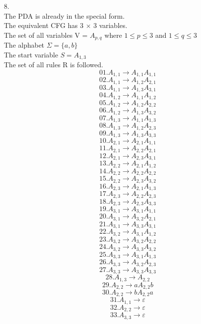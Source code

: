 \documentclass[a4paper]{article}
\begin{document}
8.\\
The PDA is already in the special form.\\
The equivalent CFG has 3 $\times$ 3 variables. \\
The set of all variables V = $A_{p,q}$ where $1 \leqslant p \leqslant 3$ and $1 \leqslant q \leqslant 3$\\
The alphabet $\Sigma = \{a,b\}$\\
The start variable $S = A_{1,3}$\\
The set of all rules R is followed.\\
$$01.A_{1,1} \rightarrow A_{1,1}A_{1,1}$$
$$02.A_{1,1} \rightarrow A_{1,2}A_{2,1}$$
$$03.A_{1,1} \rightarrow A_{1,3}A_{3,1}$$
$$04.A_{1,2} \rightarrow A_{1,1}A_{1,2}$$
$$05.A_{1,2} \rightarrow A_{1,2}A_{2,2}$$
$$06.A_{1,2} \rightarrow A_{1,3}A_{3,2}$$
$$07.A_{1,3} \rightarrow A_{1,1}A_{1,3}$$
$$08.A_{1,3} \rightarrow A_{1,2}A_{2,3}$$
$$09.A_{1,3} \rightarrow A_{1,3}A_{3,3}$$
$$10.A_{2,1} \rightarrow A_{2,1}A_{1,1}$$
$$11.A_{2,1} \rightarrow A_{2,2}A_{2,1}$$
$$12.A_{2,1} \rightarrow A_{2,3}A_{3,1}$$
$$13.A_{2,2} \rightarrow A_{2,1}A_{1,2}$$
$$14.A_{2,2} \rightarrow A_{2,2}A_{2,2}$$
$$15.A_{2,2} \rightarrow A_{2,3}A_{3,2}$$
$$16.A_{2,3} \rightarrow A_{2,1}A_{1,3}$$
$$17.A_{2,3} \rightarrow A_{2,2}A_{2,3}$$
$$18.A_{2,3} \rightarrow A_{2,3}A_{3,3}$$
$$19.A_{3,1} \rightarrow A_{3,1}A_{1,1}$$
$$20.A_{3,1} \rightarrow A_{3,2}A_{2,1}$$
$$21.A_{3,1} \rightarrow A_{3,3}A_{3,1}$$
$$22.A_{3,2} \rightarrow A_{3,1}A_{1,2}$$
$$23.A_{3,2} \rightarrow A_{3,2}A_{2,2}$$
$$24.A_{3,2} \rightarrow A_{3,3}A_{3,2}$$
$$25.A_{3,3} \rightarrow A_{3,1}A_{1,3}$$
$$26.A_{3,3} \rightarrow A_{3,2}A_{2,3}$$
$$27.A_{3,3} \rightarrow A_{3,3}A_{3,3}$$
$$28.A_{1,3} \rightarrow A_{2,2}$$
$$29.A_{2,2} \rightarrow aA_{2,2}b$$
$$30.A_{2,2} \rightarrow bA_{2,2}a$$
$$31.A_{1,1} \rightarrow \varepsilon$$
$$32.A_{2,2} \rightarrow \varepsilon$$
$$33.A_{3,3} \rightarrow \varepsilon$$
\end{document}
